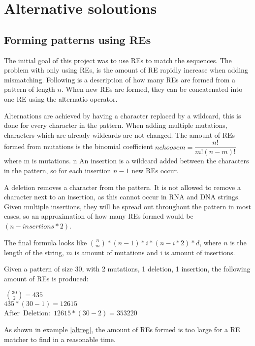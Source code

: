 \section{Alternative soloutions}
\subsection{Forming patterns using REs}
The initial goal of this project was to use REs to match the sequences. The problem with only using REs, is the amount of RE rapidly increase when adding mismatching. Following is a description of how many REs are formed from a pattern of length $n$. When new REs are formed, they can be concatenated into one RE using the alternatio operator.

Alternations are achieved by having a character replaced by a wildcard, this is done for every character in the pattern. When adding multiple mutations, characters which are already wildcards are not changed. The amount of REs formed from mutations is the binomial coefficient ${n choose m}=\dfrac{n!}{m!(n-m)!}$ where m is mutations.
n
An insertion is a wildcard added between the characters in the pattern, so for each insertion $n-1$ new REs occur. 

A deletion removes a character from the pattern. It is not allowed to remove a character next to an insertion, as this cannot occur in RNA and DNA strings. Given multiple insertions, they will be spread out throughout the pattern in most cases, so an approximation of how many REs formed would be $(n - insertions * 2)$.

The final formula looks like ${n \choose m}*(n-1)*i*(n-i*2)*d$, where $n$ is the length of the string, $m$ is amount of mutations and i is amount of insertions.

\begin{myex}\label{altreg}
Given a pattern of size 30, with 2 mutations, 1 deletion, 1 insertion, the following amount of REs is produced: \\
\begin{center}
 $~{30 \choose 2} = 435$\\
 $435 * (30-1) = 12615$\\
After~Deletion:~$12615*(30-2) = 353220$
\end{center}
\end{myex}

As shown in example \ref{altreg}, the amount of REs formed is too large for a RE matcher to find in a reasonable time. 


